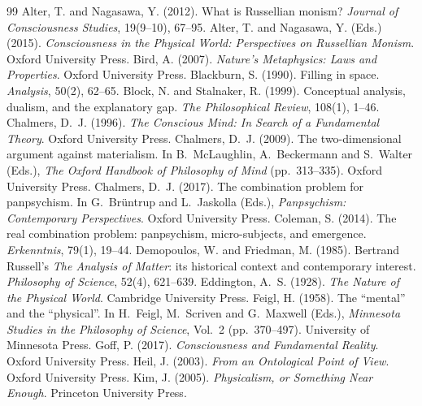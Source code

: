\documentclass{situationist-preprint}
\begin{document}
\begin{thebibliography}{99}\small
{} Alter, T. and Nagasawa, Y. (2012). What is Russellian monism? \emph{Journal of Consciousness Studies}, 19(9--10), 67--95.
 Alter, T. and Nagasawa, Y. (Eds.) (2015). \emph{Consciousness in the Physical World: Perspectives on Russellian Monism}. Oxford University Press.
 Bird, A. (2007). \emph{Nature's Metaphysics: Laws and Properties}. Oxford University Press.
 Blackburn, S. (1990). Filling in space. \emph{Analysis}, 50(2), 62--65.
 Block, N. and Stalnaker, R. (1999). Conceptual analysis, dualism, and the explanatory gap. \emph{The Philosophical Review}, 108(1), 1--46.
 Chalmers, D.~J. (1996). \emph{The Conscious Mind: In Search of a Fundamental Theory}. Oxford University Press.
 Chalmers, D.~J. (2009). The two-dimensional argument against materialism. In B.~McLaughlin, A.~Beckermann and S.~Walter (Eds.), \emph{The Oxford Handbook of Philosophy of Mind} (pp.~313--335). Oxford University Press.
 Chalmers, D.~J. (2017). The combination problem for panpsychism. In G.~Br\"untrup and L.~Jaskolla (Eds.), \emph{Panpsychism: Contemporary Perspectives}. Oxford University Press.
 Coleman, S. (2014). The real combination problem: panpsychism, micro-subjects, and emergence. \emph{Erkenntnis}, 79(1), 19--44.
 Demopoulos, W. and Friedman, M. (1985). Bertrand Russell's \emph{The Analysis of Matter}: its historical context and contemporary interest. \emph{Philosophy of Science}, 52(4), 621--639.
 Eddington, A.~S. (1928). \emph{The Nature of the Physical World}. Cambridge University Press.
 Feigl, H. (1958). The \enquote{mental} and the \enquote{physical}. In H.~Feigl, M.~Scriven and G.~Maxwell (Eds.), \emph{Minnesota Studies in the Philosophy of Science}, Vol.~2 (pp.~370--497). University of Minnesota Press.
 Goff, P. (2017). \emph{Consciousness and Fundamental Reality}. Oxford University Press.
 Heil, J. (2003). \emph{From an Ontological Point of View}. Oxford University Press.
 Kim, J. (2005). \emph{Physicalism, or Something Near Enough}. Princeton University Press.

\end{thebibliography}
\end{document}
